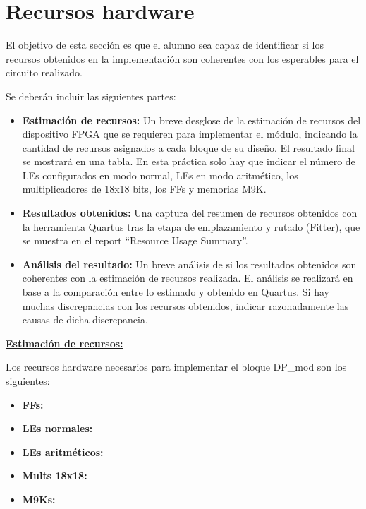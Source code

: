 \documentclass[parskip,a4paper,12pt]{article}
\begin{document}
\section{Recursos hardware}
\begin{enunciado}{}{}%
El objetivo de esta sección es que el alumno sea capaz de identificar si los recursos obtenidos en la implementación son coherentes con los esperables para el circuito realizado.

Se deberán incluir las siguientes partes: 
\begin{itemize}
\item \textbf{Estimación de recursos:} Un breve desglose de la estimación de recursos  del dispositivo FPGA que se requieren para implementar el módulo, indicando la cantidad de recursos asignados a cada bloque de su diseño. El resultado final se mostrará en una tabla. En esta práctica solo hay que indicar el número de LEs configurados en modo normal, LEs en modo aritmético, los multiplicadores de 18x18 bits, los FFs y memorias M9K. 

\item \textbf{Resultados obtenidos:} Una captura del resumen de recursos obtenidos con la herramienta Quartus tras la etapa de emplazamiento y rutado (Fitter), que se muestra en el report ``Resource Usage Summary''.  

\item \textbf{Análisis del resultado:} Un breve análisis de si los resultados obtenidos son coherentes con la estimación de recursos realizada. El análisis se realizará en base a la comparación entre lo estimado y obtenido en Quartus. Si hay muchas discrepancias con los recursos obtenidos, indicar razonadamente las causas de dicha discrepancia.
\end{itemize}

\end{enunciado}
\underline{\textbf{Estimación de recursos:}}

Los recursos hardware necesarios para implementar el bloque DP\_mod son los siguientes:
\begin{itemize}
\item \textbf{FFs:} 

\item \textbf{LEs normales:} 

\item \textbf{LEs aritméticos:} 

\item \textbf{Mults 18x18:} 

\item \textbf{M9Ks:} 
\end{itemize}
\end{document}
